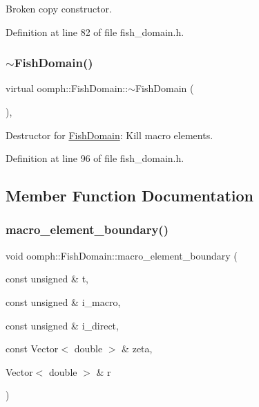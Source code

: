 Broken copy constructor. 



Definition at line 82 of file fish\+\_\+domain.\+h.

\mbox{\label{classoomph_1_1FishDomain_ab51c01c611efba9f940409e5154c9cd0}} 
\subsubsection{\texorpdfstring{$\sim$\+Fish\+Domain()}{~FishDomain()}}
{\footnotesize\ttfamily virtual oomph\+::\+Fish\+Domain\+::$\sim$\+Fish\+Domain (\begin{DoxyParamCaption}{ }\end{DoxyParamCaption})\hspace{0.3cm}{\ttfamily [inline]}, {\ttfamily [virtual]}}



Destructor for \hyperlink{classoomph_1_1FishDomain}{Fish\+Domain}\+: Kill macro elements. 



Definition at line 96 of file fish\+\_\+domain.\+h.



\subsection{Member Function Documentation}
\mbox{\label{classoomph_1_1FishDomain_a383b0fb396d605932ba6fb0779dacbf9}} 
\subsubsection{\texorpdfstring{macro\+\_\+element\+\_\+boundary()}{macro\_element\_boundary()}}
{\footnotesize\ttfamily void oomph\+::\+Fish\+Domain\+::macro\+\_\+element\+\_\+boundary (\begin{DoxyParamCaption}\item[{const unsigned \&}]{t,  }\item[{const unsigned \&}]{i\+\_\+macro,  }\item[{const unsigned \&}]{i\+\_\+direct,  }\item[{const Vector$<$ double $>$ \&}]{zeta,  }\item[{Vector$<$ double $>$ \&}]{r }\end{DoxyParamCaption})}



